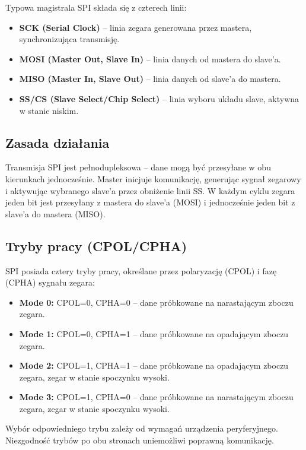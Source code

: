 \documentclass[a4paper,12pt]{report}
\begin{document}
Typowa magistrala SPI składa się z czterech linii:
\begin{itemize}
    \item \textbf{SCK (Serial Clock)} – linia zegara generowana przez mastera, synchronizująca transmisję.
    \item \textbf{MOSI (Master Out, Slave In)} – linia danych od mastera do slave'a.
    \item \textbf{MISO (Master In, Slave Out)} – linia danych od slave'a do mastera.
    \item \textbf{SS/CS (Slave Select/Chip Select)} – linia wyboru układu slave, aktywna w stanie niskim.
\end{itemize}

\subsection{Zasada działania}

Transmisja SPI jest pełnodupleksowa – dane mogą być przesyłane w obu kierunkach jednocześnie. Master inicjuje komunikację, generując sygnał zegarowy i aktywując wybranego slave'a przez obniżenie linii SS. W każdym cyklu zegara jeden bit jest przesyłany z mastera do slave'a (MOSI) i jednocześnie jeden bit z slave'a do mastera (MISO).

\subsection*{Tryby pracy (CPOL/CPHA)}

SPI posiada cztery tryby pracy, określane przez polaryzację (CPOL) i fazę (CPHA) sygnału zegara:
\begin{itemize}
    \item \textbf{Mode 0:} CPOL=0, CPHA=0 – dane próbkowane na narastającym zboczu zegara.
    \item \textbf{Mode 1:} CPOL=0, CPHA=1 – dane próbkowane na opadającym zboczu zegara.
    \item \textbf{Mode 2:} CPOL=1, CPHA=1 – dane próbkowane na opadającym zboczu zegara, zegar w stanie spoczynku wysoki.
    \item \textbf{Mode 3:} CPOL=1, CPHA=0 – dane próbkowane na narastającym zboczu zegara, zegar w stanie spoczynku wysoki.
\end{itemize}

Wybór odpowiedniego trybu zależy od wymagań urządzenia peryferyjnego. Niezgodność trybów po obu stronach uniemożliwi poprawną komunikację.
\end{document}
